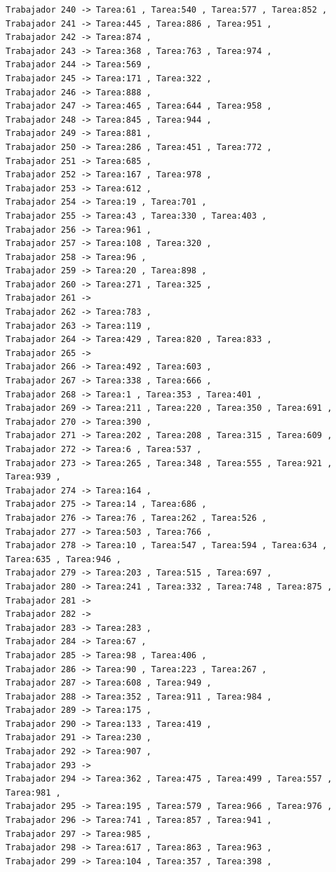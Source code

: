 \documentclass{article}
\begin{document}
\begin{lstlisting}
Trabajador 240 -> Tarea:61 , Tarea:540 , Tarea:577 , Tarea:852 , 
Trabajador 241 -> Tarea:445 , Tarea:886 , Tarea:951 , 
Trabajador 242 -> Tarea:874 , 
Trabajador 243 -> Tarea:368 , Tarea:763 , Tarea:974 , 
Trabajador 244 -> Tarea:569 , 
Trabajador 245 -> Tarea:171 , Tarea:322 , 
Trabajador 246 -> Tarea:888 , 
Trabajador 247 -> Tarea:465 , Tarea:644 , Tarea:958 , 
Trabajador 248 -> Tarea:845 , Tarea:944 , 
Trabajador 249 -> Tarea:881 , 
Trabajador 250 -> Tarea:286 , Tarea:451 , Tarea:772 , 
Trabajador 251 -> Tarea:685 , 
Trabajador 252 -> Tarea:167 , Tarea:978 , 
Trabajador 253 -> Tarea:612 , 
Trabajador 254 -> Tarea:19 , Tarea:701 , 
Trabajador 255 -> Tarea:43 , Tarea:330 , Tarea:403 , 
Trabajador 256 -> Tarea:961 , 
Trabajador 257 -> Tarea:108 , Tarea:320 , 
Trabajador 258 -> Tarea:96 , 
Trabajador 259 -> Tarea:20 , Tarea:898 , 
Trabajador 260 -> Tarea:271 , Tarea:325 , 
Trabajador 261 -> 
Trabajador 262 -> Tarea:783 , 
Trabajador 263 -> Tarea:119 , 
Trabajador 264 -> Tarea:429 , Tarea:820 , Tarea:833 , 
Trabajador 265 -> 
Trabajador 266 -> Tarea:492 , Tarea:603 , 
Trabajador 267 -> Tarea:338 , Tarea:666 , 
Trabajador 268 -> Tarea:1 , Tarea:353 , Tarea:401 , 
Trabajador 269 -> Tarea:211 , Tarea:220 , Tarea:350 , Tarea:691 , 
Trabajador 270 -> Tarea:390 , 
Trabajador 271 -> Tarea:202 , Tarea:208 , Tarea:315 , Tarea:609 , 
Trabajador 272 -> Tarea:6 , Tarea:537 , 
Trabajador 273 -> Tarea:265 , Tarea:348 , Tarea:555 , Tarea:921 , Tarea:939 , 
Trabajador 274 -> Tarea:164 , 
Trabajador 275 -> Tarea:14 , Tarea:686 , 
Trabajador 276 -> Tarea:76 , Tarea:262 , Tarea:526 , 
Trabajador 277 -> Tarea:503 , Tarea:766 , 
Trabajador 278 -> Tarea:10 , Tarea:547 , Tarea:594 , Tarea:634 , Tarea:635 , Tarea:946 , 
Trabajador 279 -> Tarea:203 , Tarea:515 , Tarea:697 , 
Trabajador 280 -> Tarea:241 , Tarea:332 , Tarea:748 , Tarea:875 , 
Trabajador 281 -> 
Trabajador 282 -> 
Trabajador 283 -> Tarea:283 , 
Trabajador 284 -> Tarea:67 , 
Trabajador 285 -> Tarea:98 , Tarea:406 , 
Trabajador 286 -> Tarea:90 , Tarea:223 , Tarea:267 , 
Trabajador 287 -> Tarea:608 , Tarea:949 , 
Trabajador 288 -> Tarea:352 , Tarea:911 , Tarea:984 , 
Trabajador 289 -> Tarea:175 , 
Trabajador 290 -> Tarea:133 , Tarea:419 , 
Trabajador 291 -> Tarea:230 , 
Trabajador 292 -> Tarea:907 , 
Trabajador 293 -> 
Trabajador 294 -> Tarea:362 , Tarea:475 , Tarea:499 , Tarea:557 , Tarea:981 , 
Trabajador 295 -> Tarea:195 , Tarea:579 , Tarea:966 , Tarea:976 , 
Trabajador 296 -> Tarea:741 , Tarea:857 , Tarea:941 , 
Trabajador 297 -> Tarea:985 , 
Trabajador 298 -> Tarea:617 , Tarea:863 , Tarea:963 , 
Trabajador 299 -> Tarea:104 , Tarea:357 , Tarea:398 , 

\end{lstlisting}
\end{document}
